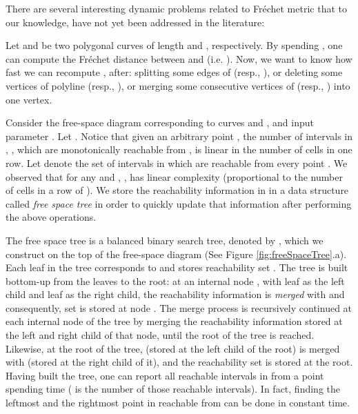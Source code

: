 \documentclass[12pt]{dalthesis}
\newcommand{\Frechet}{Fr\'echet }
\begin{document}
{{There are several interesting dynamic problems related to \Frechet metric
that to our knowledge, have not yet been addressed  in the literature:


Let   and  be 
two polygonal curves of length  and , respectively.
By spending   , one can compute the \Frechet distance between    and  (i.e. ). 
Now, we want to know how fast we can recompute , after:
  splitting some edges of  (resp., ),
  or deleting some vertices  of polyline  (resp., ),
  or merging some consecutive vertices of  (resp., ) into one vertex. 







Consider the free-space diagram  corresponding to curves  and , and input parameter .
Let . 
Notice that given an arbitrary point , the number of intervals in , , which are monotonically reachable from , 
is linear in the number of cells in one row. 
Let  denote the set of intervals in  which are reachable from 
every point . We observed that for any  and , , 
 has linear complexity (proportional to the number of cells in a row of ). 
We store the reachability information in  in a data structure 
called {\em free space tree} in order to quickly update that information 
after performing the above operations. 












The free space tree is a balanced binary search tree, denoted by , 
which we construct on the top 
of the free-space diagram (See Figure \ref{fig:freeSpaceTree}.a). 
Each leaf  in the tree corresponds to  and
stores  reachability set .
The tree is built bottom-up from the leaves to the root:
at an internal node , with leaf  as the left child
and leaf  as the right child, the reachability information 
is {\em merged} with  and consequently, set 
is stored at node .
The merge process is recursively continued at each internal node of the tree
by merging the reachability information stored at the left and right child of 
that node, until the root of the tree is reached.
Likewise, at the root of the tree, 
 (stored at the left child of the root) 
is  merged with  (stored at the right child of it),
and the reachability set  is stored  at the root. 
Having built the tree, one can report all reachable intervals in  from a point  spending  time ( is the number of those reachable intervals).
In fact, finding the leftmost and the rightmost point in  reachable from  can be done in constant time.  





}}
\end{document}
